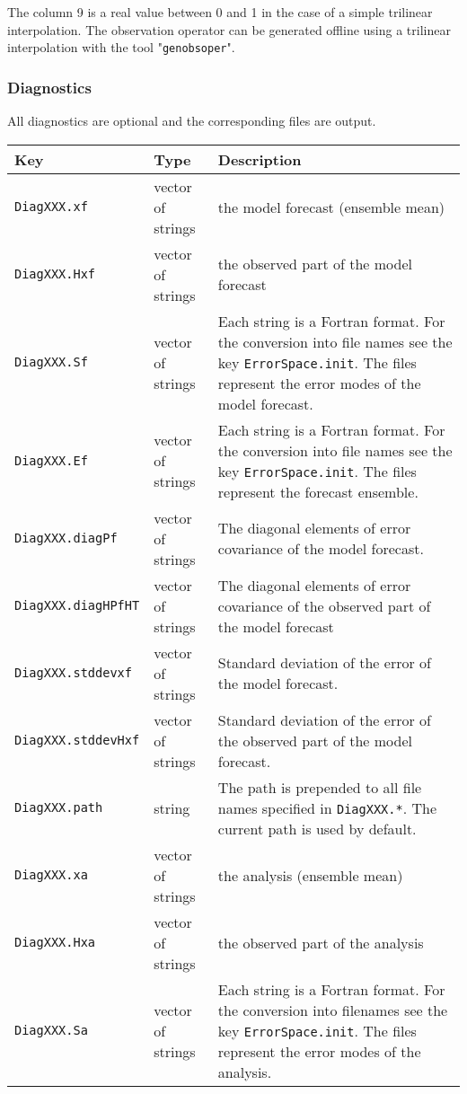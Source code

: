 \documentclass[a4paper,12pt]{article}
\newcommand{\code}{\texttt}
\newenvironment{keytabular}{\begin{tabular}{|p{0.3\textwidth}|p{0.2\textwidth}|p{0.5\textwidth}|} \hline Key & Type & Description \\ \hline \hline }{\end{tabular}}
\begin{document}
The column 9 is a real value between 0 and 1 in the case of a simple
trilinear interpolation. 
The observation operator can be generated offline using a trilinear interpolation 
with the tool "\code{genobsoper}".

\subsubsection{Diagnostics}

All diagnostics are optional and the corresponding files are output.

\begin{keytabular}
\code{DiagXXX.xf} & vector of strings & the model forecast (ensemble mean)
\\
\code{DiagXXX.Hxf} & vector of strings & the observed part of the model forecast
\\
\code{DiagXXX.Sf} & vector of strings & Each string is a Fortran
format. For the conversion into file names see the key
\code{ErrorSpace.init}. The files represent
the error modes of the model forecast.
\\
\code{DiagXXX.Ef} & vector of strings & Each string is a Fortran
format. For the conversion into file names see the key
\code{ErrorSpace.init}. The files represent
the forecast ensemble.
\\
\code{DiagXXX.diagPf} & vector of strings & The diagonal elements of error
covariance of the model forecast.
\\
\code{DiagXXX.diagHPfHT} & vector of strings & The diagonal elements of error
covariance of the observed part of the model forecast 
\\
\code{DiagXXX.stddevxf} & vector of strings & Standard deviation of
the error of the model forecast.
\\
\code{DiagXXX.stddevHxf} & vector of strings & Standard deviation of
the error of the observed part of the model forecast.
\\
\code{DiagXXX.path} & string & The path is prepended to all file names
specified in \code{DiagXXX.*}. The current path is used by default.
\\
\hline
\code{DiagXXX.xa} & vector of strings & the analysis (ensemble mean)
\\
\code{DiagXXX.Hxa} & vector of strings & the observed part of the analysis
\\
\code{DiagXXX.Sa} & vector of strings & Each string is a Fortran
format. For the conversion into filenames see the key
\code{ErrorSpace.init}. The files represent
the error modes of the analysis.

\end{keytabular}
\end{document}
